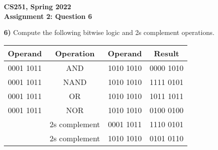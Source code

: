 \documentclass[12pt]{article}
\begin{document}
\begin{center}
{\Large\textbf{CS251, Spring 2022}}\\
\vspace{2mm}
{\Large\textbf{Assignment 2: Question 6}}\\
\vspace{3mm}
\end{center}
\textbf{6)} Compute the following bitwise logic and 2s complement operations. \\
\begin{adjustwidth}{0em}{0pt}
\begin{center}
\begin{tabular}{| c c c || c |} 
 \hline
 Operand & Operation & Operand & Result \\ [0.5ex] 
 \hline
 0001 1011 & AND & 1010 1010 & 0000 1010\\ 
 \hline
 0001 1011 & NAND & 1010 1010 & 1111 0101\\ 
 \hline
 0001 1011 & OR & 1010 1010 & 1011 1011\\ 
 \hline
 0001 1011 & NOR & 1010 1010 & 0100 0100\\ 
 \hline
 & 2s complement & 0001 1011 & 1110 0101\\ 
 \hline
 & 2s complement & 1010 1010 & 0101 0110\\ 
 \hline
\end{tabular}
\end{center}
\end{adjustwidth}
\end{document}
